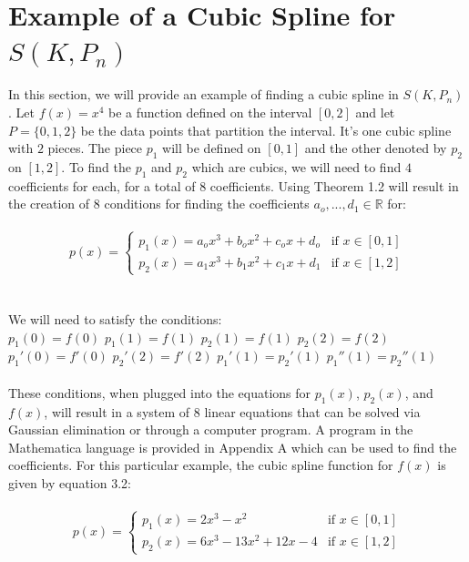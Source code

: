 \section{Example of a Cubic Spline for $S(K, P_{n})$}
In this section, we will provide an example of finding a cubic spline in $S(K, P_{n})$. Let $f(x)=x^4$ be a function defined on the interval $[0,2]$ and let $P=\{0,1,2\}$ be the data points that partition the interval. It's one cubic spline with $2$ pieces. The piece $p_1$ will be defined on $[0,1]$ and the other denoted by $p_2$ on $[1,2]$. To find the $p_1$ and $p_2$ which are cubics, we will need to find $4$ coefficients for each, for a total of $8$ coefficients. Using Theorem 1.2 will result in the creation of $8$ conditions for finding the coefficients $a_{o},...,d_{1} \in \mathbb{R}$ for:\\\\
\begin{equation}
p(x) = \begin{cases}
p_1(x)= a_{o}x^3+b_{o}x^2+c_{o}x+d_{o} & \text{if } x \in [0,1]\\
p_2(x)= a_{1}x^3+b_{1}x^2+c_{1}x+d_{1} & \text{if } x \in [1,2]
\end{cases}
\end{equation}\\\\
We will need to satisfy the conditions:\\
$p_1(0)=f(0)$\newline
$p_1(1)=f(1)$\newline
$p_2(1)=f(1)$\newline
$p_2(2)=f(2)$\newline
$p_1'(0)=f'(0)$\newline
$p_2'(2)=f'(2)$\newline
$p_1'(1)=p_2'(1)$\newline
$p_1''(1)=p_2''(1)$\\\\
These conditions, when plugged into the equations for $p_1(x)$, $p_2(x)$, and $f(x)$, will result in a system of $8$ linear equations that can be solved via Gaussian elimination or through a computer program. A program in the Mathematica language is provided in Appendix A which can be used to find the coefficients. For this particular example, the cubic spline function for $f(x)$ is given by equation 3.2:\\\\
\begin{equation}
p(x) = \begin{cases}
p_1(x)=2x^3-x^2 & \text{if } x \in [0,1]\\
p_2(x)=6x^3-13x^2+12x-4 & \text{if } x \in [1,2]
\end{cases}
\end{equation}
\\\\
